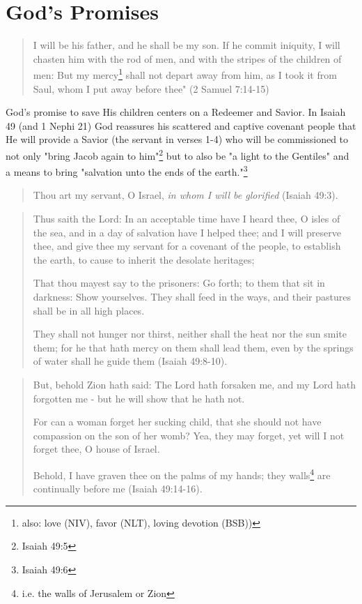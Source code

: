 \section{God's Promises}

\begin{quotation}
I will be his father, and he shall be my son. If he commit iniquity, I will chasten him with the rod of men, and with the stripes of the children of men: But my mercy\footnote{also: love (NIV), favor (NLT), loving devotion (BSB))} shall not depart away from him, as I took it from Saul, whom I put away before thee" (2 Samuel 7:14-15)
\end{quotation}

God's promise to save His children centers on a Redeemer and Savior. In Isaiah 49 (and 1 Nephi 21) God reassures his scattered and captive covenant people that He will provide a Savior (the servant in verses 1-4) who will be commissioned to not only "bring Jacob again to him"\footnote{Isaiah 49:5} but to also be "a light to the Gentiles" and a means to bring "salvation unto the ends of the earth."\footnote{Isaiah 49:6}

\begin{quotation}
Thou art my servant, O Israel, \textit{in whom I will be glorified} (Isaiah 49:3).
\end{quotation}

\begin{quotation}
Thus saith the Lord: In an acceptable time have I heard thee, O isles of the sea, and in a day of salvation have I helped thee; and I will preserve thee, and give thee my servant for a covenant of the people, to establish the earth, to cause to inherit the desolate heritages;

That thou mayest say to the prisoners: Go forth; to them that sit in darkness: Show yourselves. They shall feed in the ways, and their pastures shall be in all high places.

They shall not hunger nor thirst, neither shall the heat nor the sun smite them; for he that hath mercy on them shall lead them, even by the springs of water shall he guide them (Isaiah 49:8-10).
\end{quotation}

\begin{quotation}
But, behold Zion hath said: The Lord hath forsaken me, and my Lord hath forgotten me - but he will show that he hath not.

For can a woman forget her sucking child, that she should not have compassion on the son of her womb? Yea, they may forget, yet will I not forget thee, O house of Israel.

Behold, I have graven thee on the palms of my hands; they walls\footnote{i.e. the walls of Jerusalem or Zion} are continually before me (Isaiah 49:14-16).
\end{quotation}

